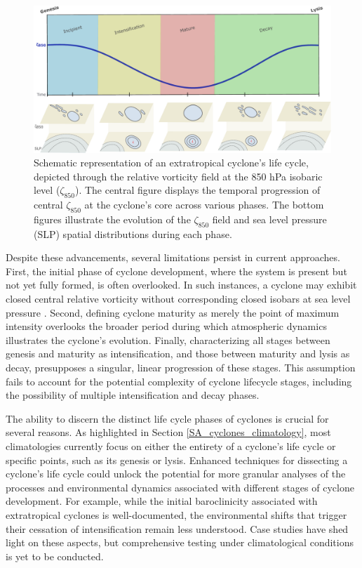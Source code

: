 \begin{figure}[h!]
\begin{center}
\setcaptionmargin{1cm}
\includegraphics[width=0.9\columnwidth,angle=0]{fig/cyclone_life_cycle.pdf}
\caption[Extratropical Cyclone Life Cycle]{Schematic representation of an extratropical cyclone's life cycle, depicted through the relative vorticity field at the 850 hPa isobaric level ($\zeta_{850}$). The central figure displays the temporal progression of central $\zeta_{850}$ at the cyclone's core across various phases. The bottom figures illustrate the evolution of the $\zeta_{850}$ field and sea level pressure (SLP) spatial distributions during each phase.}

\label{cyclone_life_cycle}
\end{center}
\end{figure}

Despite these advancements, several limitations persist in current approaches. First, the initial phase of cyclone development, where the system is present but not yet fully formed, is often overlooked. In such instances, a cyclone may exhibit closed central relative vorticity without corresponding closed isobars at sea level pressure \citep[e.g.]{sinclair1995climatology}. Second, defining cyclone maturity as merely the point of maximum intensity overlooks the broader period during which atmospheric dynamics illustrates the cyclone's evolution. Finally, characterizing all stages between genesis and maturity as intensification, and those between maturity and lysis as decay, presupposes a singular, linear progression of these stages. This assumption fails to account for the potential complexity of cyclone lifecycle stages, including the possibility of multiple intensification and decay phases.

The ability to discern the distinct life cycle phases of cyclones is crucial for several reasons. As highlighted in Section \ref{SA_cyclones_climatology}, most climatologies currently focus on either the entirety of a cyclone's life cycle or specific points, such as its genesis or lysis. Enhanced techniques for dissecting a cyclone's life cycle could unlock the potential for more granular analyses of the processes and environmental dynamics associated with different stages of cyclone development. For example, while the initial baroclinicity associated with extratropical cyclones is well-documented, the environmental shifts that trigger their cessation of intensification remain less understood. Case studies have shed light on these aspects, but comprehensive testing under climatological conditions is yet to be conducted.

